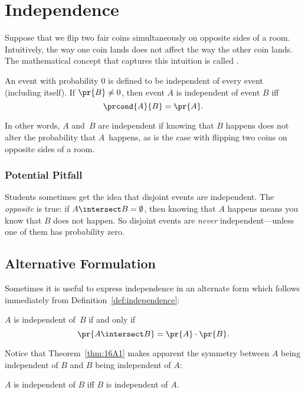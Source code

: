 \section{Independence}
Suppose that we flip two fair coins simultaneously on opposite sides
of a room.  Intuitively, the way one coin lands does not affect the
way the other coin lands.  The mathematical concept that captures
this intuition is called .
\begin{definition}\label{def:independence}
An event with probability 0 is defined to be independent of every
event (including itself).  If $\pr{B} \neq 0$, then
event $A$ is independent of event $B$ iff
\begin{equation}\label{eqn:independence}
    \prcond{A}{B} = \pr{A}.
\end{equation}
\end{definition}
In other words, $A$ and~$B$ are independent if knowing that $B$
happens does not alter the probability that $A$~happens, as is the
case with flipping two coins on opposite sides of a room.

\subsubsection{Potential Pitfall}

Students sometimes get the idea that disjoint events are independent.
The \emph{opposite} is true: if $A \intersect B = \emptyset$, then
knowing that $A$ happens means you know that $B$ does not happen.  So
disjoint events are \emph{never} independent---unless one of them has
probability zero.

\subsection{Alternative Formulation}

Sometimes it is useful to express independence in an alternate form
which follows immediately from Definition~\ref{def:independence}:

\begin{theorem}\label{thm:16A1}
$A$ is independent of~$B$ if and only if
\begin{equation}\label{eqn:15D3}
    \pr{A \intersect B} = \pr{A} \cdot \pr{B}.
\end{equation}
\end{theorem}

Notice that Theorem~\ref{thm:16A1} makes apparent the symmetry between
$A$ being independent of $B$ and $B$ being independent of $A$:
\begin{corollary}
$A$ is independent of $B$ iff $B$ is independent of $A$.
\end{corollary}


